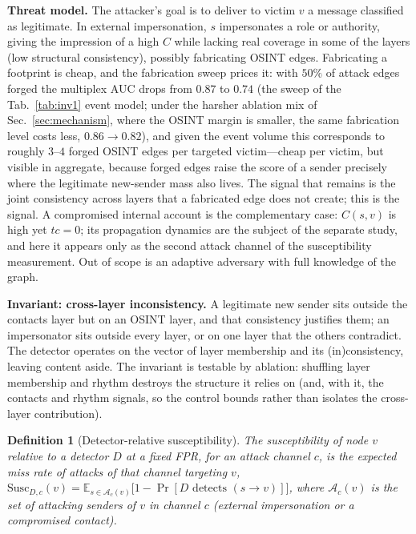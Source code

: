 \documentclass[conference]{IEEEtran}
\newtheorem{definition}{Definition}
\begin{document}
\textbf{Threat model.} The attacker's goal is to deliver to victim $v$ a message classified as legitimate. In
external impersonation, $s$ impersonates a role or authority, giving the impression of a high $C$ while
lacking real coverage in some of the layers (low structural consistency), possibly fabricating OSINT edges.
Fabricating a footprint is cheap, and the fabrication sweep prices it: with $50\%$ of attack edges forged the
multiplex AUC drops from $0.87$ to $0.74$ (the sweep of the Tab.~\ref{tab:inv1} event model;
under the harsher ablation mix of Sec.~\ref{sec:mechanism}, where the OSINT margin is smaller, the same
fabrication level costs less, $0.86\!\to\!0.82$), and given the event volume this corresponds to roughly $3$--$4$
forged OSINT edges per targeted victim---cheap per victim, but visible in aggregate, because forged edges
raise the score of a sender precisely where the legitimate new-sender mass also lives. The signal that
remains is the joint consistency across layers that a fabricated edge does not create; this is the signal.
A compromised
internal account is the complementary case: $C(s,v)$ is high yet $tc=0$; its propagation dynamics are the
subject of the separate study, and here it appears only as the second attack channel of the susceptibility
measurement. Out of scope is an adaptive adversary with full knowledge of the graph.

\textbf{Invariant: cross-layer inconsistency.} A legitimate new sender sits outside the contacts layer but on
an OSINT layer, and that consistency justifies them; an impersonator sits outside every layer, or on one layer
that the others contradict. The detector operates on the vector of layer membership and its (in)consistency,
leaving content aside. The invariant is testable by ablation: shuffling layer membership and rhythm
destroys the structure it relies on (and, with it, the contacts and rhythm signals, so the control bounds
rather than isolates the cross-layer contribution).

\begin{definition}[Detector-relative susceptibility]
\label{def:susc}
The susceptibility of node $v$ relative to a detector $D$ at a fixed FPR, for an attack channel $c$, is the
expected miss rate of attacks of that channel targeting $v$,
$\mathrm{Susc}_{D,c}(v) = \mathbb{E}_{s\in\mathcal{A}_c(v)}\big[1-\Pr[D \text{ detects }(s\!\to\!v)]\big]$,
where $\mathcal{A}_c(v)$ is the set of attacking senders of $v$ in channel $c$ (external impersonation or a
compromised contact).
\end{definition}
\end{document}

